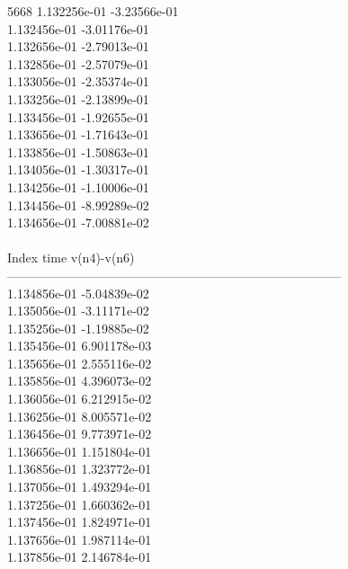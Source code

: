 5668	1.132256e-01	-3.23566e-01	\\ 	1.132456e-01	-3.01176e-01	\\ 	1.132656e-01	-2.79013e-01	\\ 	1.132856e-01	-2.57079e-01	\\ 	1.133056e-01	-2.35374e-01	\\ 	1.133256e-01	-2.13899e-01	\\ 	1.133456e-01	-1.92655e-01	\\ 	1.133656e-01	-1.71643e-01	\\ 	1.133856e-01	-1.50863e-01	\\ 	1.134056e-01	-1.30317e-01	\\ 	1.134256e-01	-1.10006e-01	\\ 	1.134456e-01	-8.99289e-02	\\ 	1.134656e-01	-7.00881e-02	\\ \hline
\\ \hline
Index   time            v(n4)-v(n6)     \\ \hline
--------------------------------------------------------------------------------\\ 	1.134856e-01	-5.04839e-02	\\ 	1.135056e-01	-3.11171e-02	\\ 	1.135256e-01	-1.19885e-02	\\ 	1.135456e-01	6.901178e-03	\\ 	1.135656e-01	2.555116e-02	\\ 	1.135856e-01	4.396073e-02	\\ 	1.136056e-01	6.212915e-02	\\ 	1.136256e-01	8.005571e-02	\\ 	1.136456e-01	9.773971e-02	\\ 	1.136656e-01	1.151804e-01	\\ 	1.136856e-01	1.323772e-01	\\ 	1.137056e-01	1.493294e-01	\\ 	1.137256e-01	1.660362e-01	\\ 	1.137456e-01	1.824971e-01	\\ 	1.137656e-01	1.987114e-01	\\ 	1.137856e-01	2.146784e-01	\\ \hline
